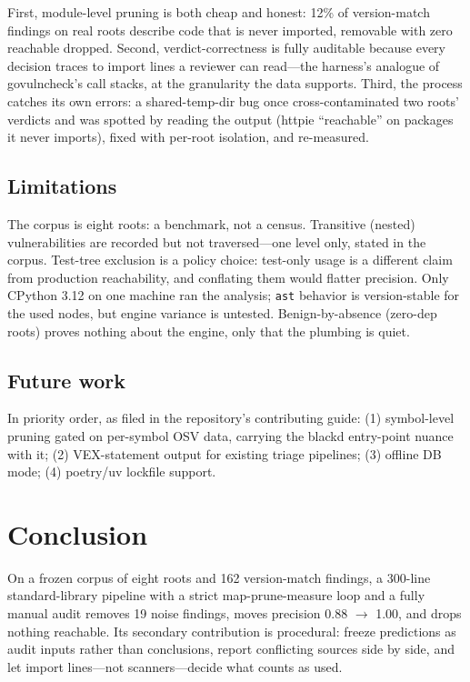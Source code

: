 \documentclass[11pt,a4paper]{article}
\begin{document}
First, module-level pruning is both cheap and honest: 12\% of version-match findings on real roots describe code that is never imported, removable with zero reachable dropped. Second, verdict-correctness is fully auditable because every decision traces to import lines a reviewer can read---the harness's analogue of govulncheck's call stacks, at the granularity the data supports. Third, the process catches its own errors: a shared-temp-dir bug once cross-contaminated two roots' verdicts and was spotted by reading the output (httpie ``reachable'' on packages it never imports), fixed with per-root isolation, and re-measured.

\subsection{Limitations}

The corpus is eight roots: a benchmark, not a census. Transitive (nested) vulnerabilities are recorded but not traversed---one level only, stated in the corpus. Test-tree exclusion is a policy choice: test-only usage is a different claim from production reachability, and conflating them would flatter precision. Only CPython 3.12 on one machine ran the analysis; \verb!ast! behavior is version-stable for the used nodes, but engine variance is untested. Benign-by-absence (zero-dep roots) proves nothing about the engine, only that the plumbing is quiet.

\subsection{Future work}

In priority order, as filed in the repository's contributing guide: (1) symbol-level pruning gated on per-symbol OSV data, carrying the blackd entry-point nuance with it; (2) VEX-statement output for existing triage pipelines; (3) offline DB mode; (4) poetry/uv lockfile support.

\section{Conclusion}

On a frozen corpus of eight roots and 162 version-match findings, a 300-line standard-library pipeline with a strict map-prune-measure loop and a fully manual audit removes 19 noise findings, moves precision 0.88 $\to$ 1.00, and drops nothing reachable. Its secondary contribution is procedural: freeze predictions as audit inputs rather than conclusions, report conflicting sources side by side, and let import lines---not scanners---decide what counts as used.
\end{document}
